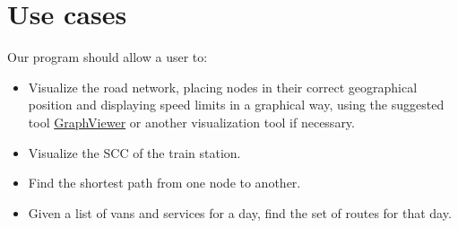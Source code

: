\chapter{Use cases} \label{use-cases}
Our program should allow a user to:
\begin{itemize}
    \item Visualize the road network, placing nodes in their correct geographical position and displaying speed limits in a graphical way, using the suggested tool \href{https://github.com/STEMS-group/GraphViewer}{GraphViewer} or another visualization tool if necessary.
    \item Visualize the \acrshort{SCC} of the train station.
    \item Find the shortest path from one node to another.
    \item Given a list of vans and services for a day, find the set of routes for that day.
\end{itemize}
